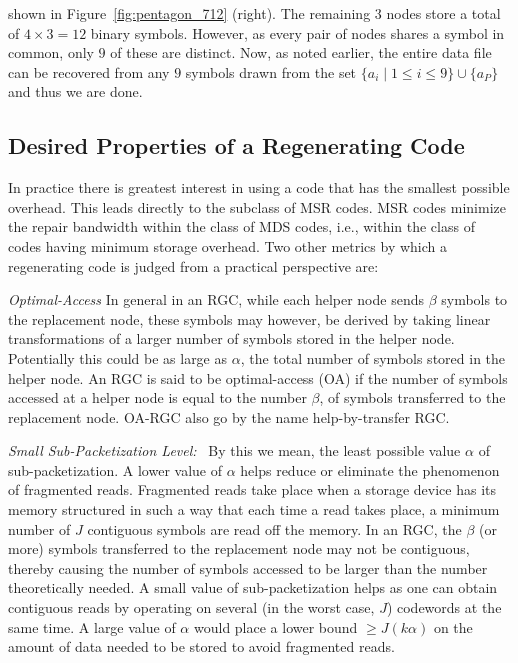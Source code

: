 \begin{multicols}{2}
\noindent
shown in Figure~\ref{fig:pentagon_712} (right).  The remaining $3$ nodes store a total of $4 \times 3=12$ binary symbols. However, as every pair of nodes shares a symbol in common, only $9$ of these are distinct.  Now, as noted earlier, the entire data file can be recovered from any $9$ symbols drawn from the set $\{a_i \mid 1 \leq i \leq 9\} \cup \{a_P\}$ and thus we are done. 

\subsection{Desired Properties of a Regenerating Code} 

In practice there is greatest interest in using a code that has the smallest possible overhead.  This leads directly to the subclass of MSR codes.  MSR codes minimize the repair bandwidth within the class of MDS codes, i.e., within the class of codes having minimum storage overhead.  Two other metrics by which a regenerating code is judged from a practical perspective are:
\ben
\item {\em Optimal-Access} In general in an RGC, while each helper node sends $\beta$ symbols to the replacement node, these symbols may however, be derived by taking linear transformations of a larger number of symbols stored in the helper node. Potentially this could be as large as $\alpha$, the total number of symbols stored in the helper node. An RGC is said to be optimal-access (OA) if the number of symbols accessed at a helper node is equal to the number $\beta$, of symbols transferred to the replacement node. OA-RGC also go by the name help-by-transfer RGC.  
\item {\em Small Sub-Packetization Level:} \ By this we mean, the least possible value $\alpha$ of sub-packetization.  A lower value of $\alpha$ helps reduce or eliminate the phenomenon of fragmented reads. Fragmented reads take place when a storage device has its memory structured in such a way that each time a read takes place, a minimum number of $J$ contiguous symbols are read off the memory.  In an RGC, the $\beta$ (or more) symbols transferred to the replacement node may not be contiguous, thereby causing the number of symbols accessed to be larger than the number theoretically needed. A small value of sub-packetization helps as one can obtain contiguous reads by operating on several (in the worst case, $J$) codewords at the same time.  A large value of $\alpha$ would place a lower bound $\geq J(k \alpha)$ on the amount of data needed to be stored to avoid fragmented reads. 


\end{multicols}
